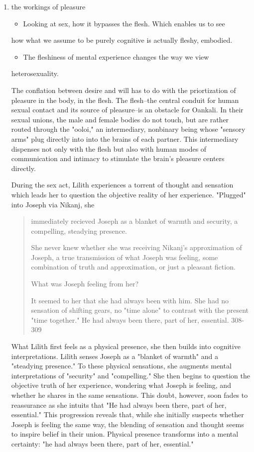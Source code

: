 \documentclass[11pt]{article}
\begin{document}
\begin{enumerate}
\item the workings of pleasure
\label{sec:orgdc07a4a}
\begin{itemize}
\item Looking at sex, how it bypasses the flesh. Which enables us to see
\end{itemize}
how what we assume to be purely cognitive is actually fleshy,
embodied. 
\begin{itemize}
\item The fleshiness of mental experience changes the way we view
\end{itemize}
heterosexuality. 

The conflation between desire and will has to do with the
priortization of pleasure in the body, in the flesh. The flesh--the
central conduit for human sexual contact and its source of
pleasure--is an obstacle for Oankali. In their sexual unions, the male
and female bodies do not touch, but are rather routed through the
"ooloi," an intermediary, nonbinary being whose "sensory arms" plug
directly into into the brains of each partner. This intermediary
dispenses not only with the flesh but also with human modes of
communication and intimacy to stimulate the brain's pleasure centers
directly.

During the sex act, Lilith experiences a torrent of thought and
sensation which leads her to question the objective reality of her
experience. "Plugged" into Joseph via Nikanj, she
\begin{quote}
immediately recieved Joseph as a blanket of warmth and security, a
compelling, steadying presence. 

She never knew whether she was receiving Nikanj's approximation of
Joseph, a true transmission of what Joseph was feeling, some
combination of truth and approximation, or just a pleasant fiction. 

What was Joseph feeling from her?

It seemed to her that she had always been with him. She had no
sensation of shifting gears, no "time alone" to contrast with the
present "time together." He had always been there, part of her,
essential. 308-309
\end{quote}
What Lilith first feels as a physical presence, she then builds into
cognitive interpretations. Lilith senses Joseph as a "blanket of
warmth" and a "steadying presence." To these physical sensations, she
augments mental interpretations of "security" and "compelling." She
then begins to question the objective truth of her experience,
wondering what Joseph is feeling, and whether he shares in the same
sensations. This doubt, however, soon fades to reassurance as she
intuits that "He had always been there, part of her, essential." This
progression reveals that, while she initially suspects whether Joseph
is feeling the same way, the blending of sensation and thought seems
to inspire belief in their union. Physical presence transforms into a
mental certainty: "he had always been there, part of her, essential."


\end{enumerate}
\end{document}
